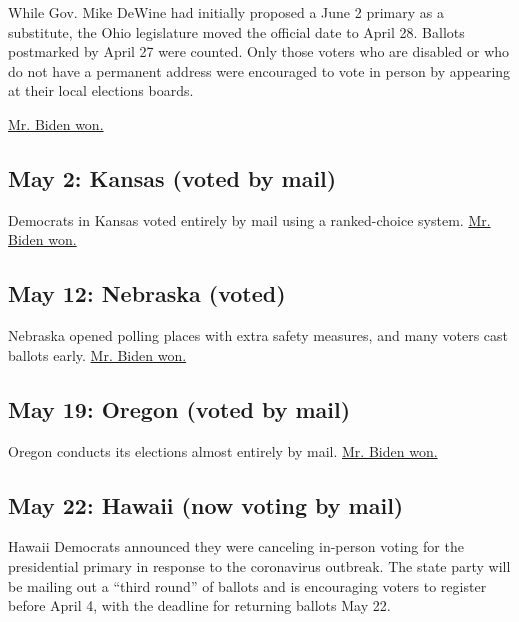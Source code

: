 While Gov. Mike DeWine had initially proposed a June 2 primary as a
substitute, the Ohio legislature moved the official date to April 28.
Ballots postmarked by April 27 were counted. Only those voters who are
disabled or who do not have a permanent address were encouraged to vote
in person by appearing at their local elections boards.

\href{https://www.nytimes.com/interactive/2020/04/28/us/elections/results-ohio-primary-elections.html}{Mr.
Biden won.}

\hypertarget{may-2-kansas-voted-by-mail}{%
\subsection{May 2: Kansas (voted by
mail)}\label{may-2-kansas-voted-by-mail}}

Democrats in Kansas voted entirely by mail using a ranked-choice system.
\href{https://www.nytimes.com/interactive/2020/05/02/us/elections/results-kansas-president-democrat-primary-election.html}{Mr.
Biden won.}

\hypertarget{may-12-nebraska-voted}{%
\subsection{May 12: Nebraska (voted)}\label{may-12-nebraska-voted}}

Nebraska opened polling places with extra safety measures, and many
voters cast ballots early.
\href{https://www.nytimes.com/interactive/2020/05/12/us/elections/results-nebraska-president-democrat-primary-election.html}{Mr.
Biden won.}

\hypertarget{may-19-oregon-voted-by-mail}{%
\subsection{May 19: Oregon (voted by
mail)}\label{may-19-oregon-voted-by-mail}}

Oregon conducts its elections almost entirely by mail.
\href{https://www.nytimes.com/interactive/2020/05/19/us/elections/results-oregon-primary-elections.html}{Mr.
Biden won.}

\hypertarget{may-22-hawaii-now-voting-by-mail}{%
\subsection{May 22: Hawaii (now voting by
mail)}\label{may-22-hawaii-now-voting-by-mail}}

Hawaii Democrats announced they were canceling in-person voting for the
presidential primary in response to the coronavirus outbreak. The state
party will be mailing out a ``third round'' of ballots and is
encouraging voters to register before April 4, with the deadline for
returning ballots May 22.

